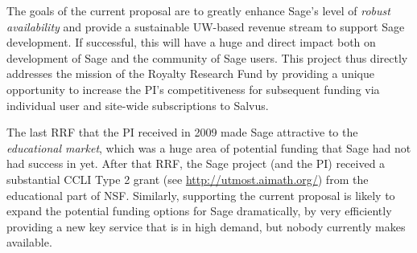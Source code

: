 \documentclass[11pt]{article}
\begin{document}
The goals of the current proposal are to greatly enhance Sage's level
of {\em robust availability} and provide a sustainable UW-based
revenue stream to support Sage development.  If successful, this will
have a huge and direct impact both on development of Sage and the
community of Sage users.  This project thus directly addresses the
mission of the Royalty Research Fund by providing a unique opportunity
to increase the PI's competitiveness for subsequent funding via
individual user and site-wide subscriptions to Salvus.

The last RRF that the PI received in 2009 made Sage attractive to the
{\em educational market}, which was a huge area of potential funding
that Sage had not had success in yet.  After that RRF, the Sage
project (and the PI) received a substantial CCLI Type 2 grant (see
\url{http://utmost.aimath.org/}) from the educational part of NSF.
Similarly, supporting the current proposal is likely to expand the
potential funding options for Sage dramatically, by very efficiently
providing a new key service that is in high demand, but nobody
currently makes available.
\end{document}
